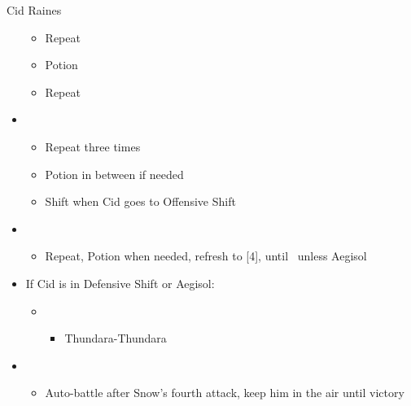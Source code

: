 \begin{multicols}{2}
\begin{battle}{Cid Raines}
\begin{itemize}
    \begin{itemize}
        \item Repeat
        \item Potion
        \item Repeat
    \end{itemize}
    \item \second
    \begin{itemize}
        \item Repeat three times
        \item Potion in between if needed
        \item Shift when Cid goes to Offensive Shift
    \end{itemize}
    \item \third
    \begin{itemize}
        \item Repeat, Potion when needed, refresh to [4], until \stagger\ unless Aegisol
    \end{itemize}
    \item If Cid is in Defensive Shift or Aegisol:
    \begin{itemize}
        \item \second
        \begin{itemize}
            \item Thundara-Thundara
        \end{itemize}
    \end{itemize}
    \item \sixth
    \begin{itemize}
        \item Auto-battle after Snow's fourth attack, keep him in the air until victory
    \end{itemize}
\end{itemize}
\end{battle}


\end{multicols}
